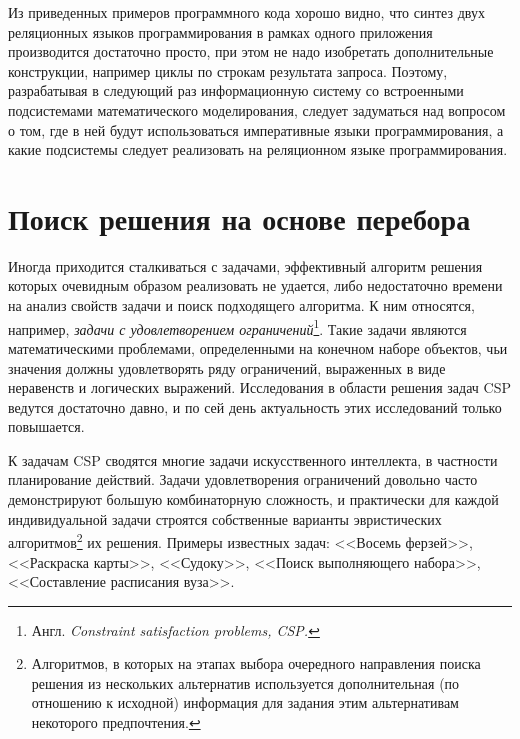 \documentclass[a4paper,14pt, openany, twoside, final]{extbook} %
\newcommand{\nnn}[2][ncolor]{\noindent%
\textcolor{eclr}{!\ [}\textcolor{#1}{#2}\textcolor{eclr}{]}}
\begin{document}
Из приведенных примеров программного кода хорошо видно, что синтез двух реляционных языков программирования в рамках одного приложения производится достаточно просто, при этом не надо изобретать дополнительные конструкции, например циклы по строкам результата запроса.  Поэтому, разрабатывая в следующий раз информационную систему со встроенными подсистемами математического моделирования, следует задуматься над вопросом о том, где в ней будут использоваться императивные языки программирования, а какие подсистемы следует реализовать на реляционном языке программирования.



\chapter{Поиск решения на основе перебора} \label{sec:britmuseum}

Иногда приходится сталкиваться с задачами, эффективный алгоритм решения которых очевидным образом реализовать не удается, либо недостаточно времени на анализ свойств задачи и поиск подходящего алгоритма. К ним относятся, например, \emph{задачи с удовлетворением ограничений}\footnote{Англ. \emph{\foreignlanguage{english}{Constraint satisfaction problems}, CSP.}}. Такие задачи являются математическими проблемами, определенными на конечном наборе объектов, чьи значения должны удовлетворять ряду ограничений, выраженных в виде неравенств и логических выражений. Исследования в области решения задач CSP ведутся достаточно давно, и по сей день актуальность этих исследований только повышается.

К задачам CSP сводятся многие задачи искусственного интеллекта, в частности планирование действий. Задачи удовлетворения ограничений довольно часто демонстрируют большую комбинаторную сложность, и практически для каждой индивидуальной задачи строятся собственные варианты эвристических алгоритмов\footnote{Алгоритмов, в которых на этапах выбора очередного направления поиска решения из нескольких альтернатив используется дополнительная (по отношению к исходной) информация для задания этим альтернативам некоторого предпочтения.} их решения. Примеры известных задач: <<Восемь ферзей>>, <<Раскраска карты>>, <<Судоку>>, <<Поиск выполняющего набора>>, <<Составление расписания вуза>>.
\end{document}
